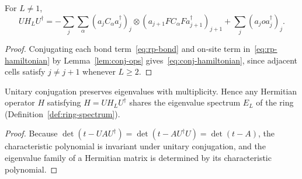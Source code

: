 \begin{theorem}
  \label{thm:conj-hamiltonian}
  \leanok
  For \(L \ne 1\),
  \begin{equation}
    \label{eq:conj-hamiltonian}
    U H_L U^\dagger = -\sum_j \sum_\alpha (a_j C_\alpha a_j^\dagger)_j \otimes
    (a_{j+1} F C_\alpha F a_{j+1}^\dagger)_{j+1} + \sum_j (a_j o a_j^\dagger)_j.
  \end{equation}
\end{theorem}
\begin{proof}
  \leanok
  Conjugating each bond term~\eqref{eq:rp-bond} and on-site term in~\eqref{eq:rp-hamiltonian} by
  Lemma~\ref{lem:conj-ops} gives~\eqref{eq:conj-hamiltonian}, since adjacent cells satisfy
  \(j \ne j+1\) whenever \(L \ge 2\).
\end{proof}

\begin{theorem}
  \label{thm:conj-spectrum}
  \leanok
  Unitary conjugation preserves eigenvalues with multiplicity. Hence any Hermitian operator \(H\)
  satisfying \(H = U H_L U^\dagger\) shares the eigenvalue spectrum \(E_L\) of the ring
  (Definition~\ref{def:ring-spectrum}).
\end{theorem}
\begin{proof}
  \leanok
  Because \(\det(t - U A U^\dagger) = \det(t - A U^\dagger U) = \det(t - A)\), the characteristic
  polynomial is invariant under unitary conjugation, and the eigenvalue family of a Hermitian
  matrix is determined by its characteristic polynomial.
\end{proof}

